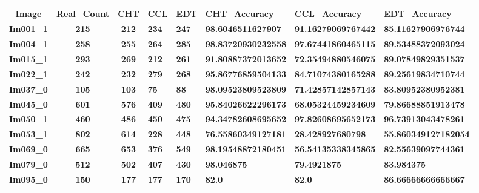 \begin{table}[H]
\centering
\begin{tabular}{|c|c|c|}
\hline
 \textbf{Image} & \textbf{Real\_Count} & \textbf{CHT} & \textbf{CCL} & \textbf{EDT} & \textbf{CHT\_Accuracy} & \textbf{CCL\_Accuracy} & \textbf{EDT\_Accuracy} \\ \hline
 \textbf{Im001\_1} & \textbf{215} & \textbf{212} & \textbf{234} & \textbf{247} & \textbf{98.6046511627907} & \textbf{91.16279069767442} & \textbf{85.11627906976744} \\ \hline
 \textbf{Im004\_1} & \textbf{258} & \textbf{255} & \textbf{264} & \textbf{285} & \textbf{98.83720930232558} & \textbf{97.67441860465115} & \textbf{89.53488372093024} \\ \hline
 \textbf{Im015\_1} & \textbf{293} & \textbf{269} & \textbf{212} & \textbf{261} & \textbf{91.80887372013652} & \textbf{72.35494880546075} & \textbf{89.07849829351537} \\ \hline
 \textbf{Im022\_1} & \textbf{242} & \textbf{232} & \textbf{279} & \textbf{268} & \textbf{95.86776859504133} & \textbf{84.71074380165288} & \textbf{89.25619834710744} \\ \hline
 \textbf{Im037\_0} & \textbf{105} & \textbf{103} & \textbf{75} & \textbf{88} & \textbf{98.09523809523809} & \textbf{71.42857142857143} & \textbf{83.80952380952381} \\ \hline
 \textbf{Im045\_0} & \textbf{601} & \textbf{576} & \textbf{409} & \textbf{480} & \textbf{95.84026622296173} & \textbf{68.05324459234609} & \textbf{79.86688851913478} \\ \hline
 \textbf{Im050\_1} & \textbf{460} & \textbf{486} & \textbf{450} & \textbf{475} & \textbf{94.34782608695652} & \textbf{97.82608695652173} & \textbf{96.73913043478261} \\ \hline
 \textbf{Im053\_1} & \textbf{802} & \textbf{614} & \textbf{228} & \textbf{448} & \textbf{76.55860349127181} & \textbf{28.428927680798} & \textbf{55.860349127182054} \\ \hline
 \textbf{Im069\_0} & \textbf{665} & \textbf{653} & \textbf{376} & \textbf{549} & \textbf{98.19548872180451} & \textbf{56.54135338345865} & \textbf{82.55639097744361} \\ \hline
 \textbf{Im079\_0} & \textbf{512} & \textbf{502} & \textbf{407} & \textbf{430} & \textbf{98.046875} & \textbf{79.4921875} & \textbf{83.984375} \\ \hline
 \textbf{Im095\_0} & \textbf{150} & \textbf{177} & \textbf{177} & \textbf{170} & \textbf{82.0} & \textbf{82.0} & \textbf{86.66666666666667} \\ \hline

\end{tabular}
\end{table}
